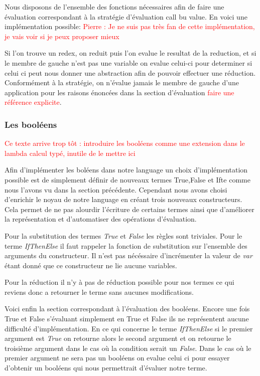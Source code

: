\documentclass {article}
\newcommand{\codefrom}[3]
           {}
\theoremstyle{definition}
\theoremstyle{remark}
\newcommand{\todo}[1]{\textcolor{red}{#1}}
\begin{document}
\codefrom{untyped}{lambda}{reduction}

Nous disposons de l'ensemble des fonctions nécessaires afin de faire une évaluation 
correspondant à la stratégie d'évaluation call bu value. En voici une implémentation
possible: 
\todo{Pierre : Je ne suis pas très fan de cette implémentation, je vais voir si je peux proposer mieux}

\codefrom{untyped}{lambda}{evaluation}

Si l'on trouve un redex, on reduit puis l'on evalue le resultat de la reduction,
et si le membre de gauche n'est pas une variable on evalue celui-ci pour determiner
si celui ci peut nous donner une abstraction afin de pouvoir effectuer une réduction.
Conformément à la stratégie, on n'évalue jamais le membre de gauche d'une application
pour les raisons énoncées dans la section d'évaluation \todo{faire une référence explicite}.


\subsubsection{Les booléens}

\todo{Ce texte arrive trop tôt : introduire les booléens comme une extension dans le lambda calcul typé, inutile de le mettre ici}

Afin d'implémenter les boléens dans notre language un choix d'implémentation 
possible est de simplement définir de nouveaux termes True,False et Ifte
comme nous l'avons vu dans la section précédente. Cependant nous avons choisi 
d'enrichir le noyau de notre language en créant trois nouveaux constructeurs.
Cela permet de ne pas alourdir l'écriture de certains termes ainsi que 
d'améliorer la représentation et d'automatiser des opérations d'évaluation.

\codefrom{untyped}{lambda}{bool_term}

Pour la substitution des termes \emph{True} et \emph{False} les règles 
sont triviales. Pour le terme \emph{IfThenElse} il faut rappeler la 
fonction de substitution sur l'ensemble des arguments du constructeur.
Il n'est pas nécéssaire d'incrémenter la valeur de \emph{var} étant donné
que ce constructeur ne lie aucune variables.

\codefrom{untyped}{lambda}{bool_substitution}

Pour la réduction il n'y à pas de réduction possible pour nos termes
ce qui reviens donc a retourner le terme sans aucunes modifications.


Voici enfin la section correspondant à l'évaluation des booléens.
Encore une fois True et False s'évaluant simplement en True et False ils
ne représentent aucune difficulté d'implémentation. En ce qui concerne
le terme \emph{IfThenElse} si le premier argument est \emph{True}
on retourne alors le second argument et on retourne le troisième argument 
dans le cas où la condition serait un \emph{False}. Dans le cas 
où le premier argument ne sera pas un booléens on evalue celui ci pour 
essayer d'obtenir un booléens qui nous permettrait d'évaluer notre 
terme.
\end{document}
